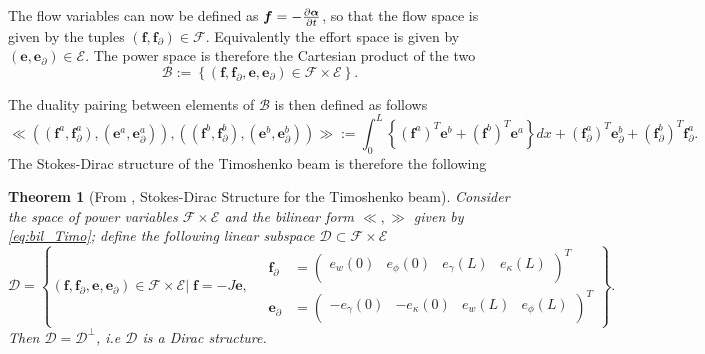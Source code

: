 \documentclass[preprint,12pt]{elsarticle}
\newtheorem{theorem}{Theorem}
\begin{document}
The flow variables can now be defined as $\bm{f} = - \diffp{\bm{\alpha}}{t}$, so that the flow space is given by the tuples
$(\bm{f},\bm{f}_{\partial}) \in \mathcal{F}$. Equivalently the effort space is given by $(\bm{e},\bm{e}_{\partial}) \in \mathcal{E}$. The power space is therefore the Cartesian product of the two
\begin{equation}
	\mathcal{B} := \left\{(\bm{f},\bm{f}_{\partial},\bm{e},\bm{e}_{\partial}) \in \mathcal{F} \times \mathcal{E} \right\}.
\end{equation}

The duality pairing between elements of $\mathcal{B}$ is then defined as follows
\begin{equation}
\label{eq:bil_Timo}
\ll ((\bm{f}^a,\bm{f}_{\partial}^a), (\bm{e}^a,\bm{e}_{\partial}^a)), ((\bm{f}^b,\bm{f}_{\partial}^b), (\bm{e}^b,\bm{e}_{\partial}^b)) \gg := \int_{0}^{L}\left\{ (\bm{f}^{a})^T \bm{e}^b + (\bm{f}^{b})^T \bm{e}^a \right\} dx + (\bm{f}_{\partial}^{a})^T \bm{e}_{\partial}^b + (\bm{f}_{\partial}^{b}) ^T \bm{f}_{\partial}^a.
\end{equation}
The Stokes-Dirac structure of the Timoshenko beam is therefore the following
\begin{theorem}[From \cite{MacchelliTimo}, Stokes-Dirac Structure for the Timoshenko beam]
Consider the space of power variables $\mathcal{F} \times \mathcal{E}$ and the bilinear form $\ll , \gg$ given by \eqref{eq:bil_Timo}; define the following linear subspace $\mathcal{D} \subset \mathcal{F} \times \mathcal{E}$
\begin{equation}
\mathcal{D} =  \left\{(\bm{f},\bm{f}_{\partial},\bm{e},\bm{e}_{\partial}) \in \mathcal{F} \times \mathcal{E} | \; \bm{f} = -J\bm{e},  \quad
\begin{aligned}
\bm{f}_{\partial} &= 
\begin{pmatrix}
e_w(0) & e_{\phi}(0) & e_{\gamma}(L) & e_{\kappa}(L) \\
\end{pmatrix}^T \\
\bm{e}_{\partial} &= 
\begin{pmatrix}
-e_{\gamma}(0) & -e_{\kappa}(0) & e_{w}(L) & e_{\phi}(L) \\
\end{pmatrix}^T
\end{aligned} \right\}.
\end{equation}
Then $\mathcal{D} = \mathcal{D}^{\perp}$, i.e $\mathcal{D}$ is a Dirac structure.
\end{theorem}
\end{document}
